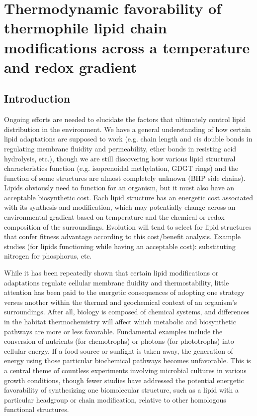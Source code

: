 \chapter{Thermodynamic favorability of thermophile lipid chain modifications across a temperature and redox gradient}\label{ch2}

\section{Introduction}


Ongoing efforts are needed to elucidate the factors that ultimately control lipid distribution in the environment. We have a general understanding of how certain lipid adaptations are supposed to work (e.g. chain length and cis double bonds in regulating membrane fluidity and permeability, ether bonds in resisting acid hydrolysis, etc.), though we are still discovering how various lipid structural characteristics function (e.g. isoprenoidal methylation, GDGT rings) and the function of some structures are almost completely unknown (BHP side chains). Lipids obviously need to function for an organism, but it must also have an acceptable biosynthetic cost. Each lipid structure has an energetic cost associated with its synthesis and modification, which may potentially change across an environmental gradient based on temperature and the chemical or redox composition of the surroundings. Evolution will tend to select for lipid structures that confer fitness advantage according to this cost/benefit analysis. Example studies (for lipids functioning while having an acceptable cost): substituting nitrogen for phosphorus, etc. 




While it has been repeatedly shown that certain lipid modifications or adaptations regulate cellular membrane fluidity and thermostability, little attention has been paid to the energetic consequences of adopting one strategy versus another within the thermal and geochemical context of an organism's surroundings. After all, biology is composed of chemical systems, and differences in the habitat thermochemistry will affect which metabolic and biosynthetic pathways are more or less favorable.  Fundamental examples include the conversion of nutrients (for chemotrophs) or photons (for phototrophs) into cellular energy. If a food source or sunlight is taken away, the generation of energy using those particular biochemical pathways becomes unfavorable. This is a central theme of countless experiments involving microbial cultures in various growth conditions, though fewer studies have addressed the potential energetic favorability of synthesizing one biomolecular structure, such as a lipid with a particular headgroup or chain modification, relative to other homologous functional structures.

